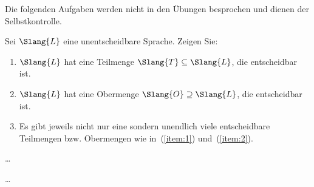 \documentclass[german]{latteachCD}[2017/03/28]
\begin{document}
\maketitle

\begin{mdframed}
  Die folgenden Aufgaben werden nicht in den Übungen besprochen und dienen der
  Selbstkontrolle.

  \renewcommand{\theexercise}{\Alph{exercise}}
  \setcounter{exercise}{7}

  \begin{exercise}
    Sei $\Slang{L}$ eine unentscheidbare Sprache. Zeigen Sie:
    \begin{enumerate}
    \item\label{item:1} $\Slang{L}$ hat eine Teilmenge $\Slang{T}\subseteq \Slang{L}$, die
      entscheidbar ist.
    \item\label{item:2} $\Slang{L}$ hat eine Obermenge $\Slang{O}\supseteq
      \Slang{L}$, die entscheidbar ist.
    \item Es gibt jeweils nicht nur eine sondern unendlich viele entscheidbare
      Teilmengen bzw. Obermengen wie in~(\ref{item:1}) und~(\ref{item:2}).
    \end{enumerate}
  \end{exercise}

  \begin{exercise}
    \dots
  \end{exercise}

\end{mdframed}

\vspace*{0.5\baselineskip}

\setcounter{exercise}{0}

\dots
\end{document}
